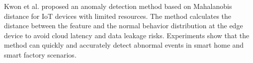 \begin{ZhChapter}
    Kwon et al. \cite{kwon2019lightweight} proposed an anomaly detection method based on Mahalanobis distance for IoT devices with limited resources. The method calculates the distance between the feature and the normal behavior distribution at the edge device to avoid cloud latency and data leakage risks. Experiments show that the method can quickly and accurately detect abnormal events in smart home and smart factory scenarios.









\end{ZhChapter}